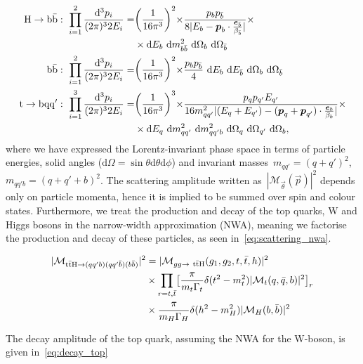 \begin{align}
\label{eq:phase_space_jacobian}
\mathrm{H} \rightarrow \mathrm{b}\bar{\mathrm{b}}:\ \prod_{i=1}^{2} \frac{\mathrm{d}^3 p_i}{(2\pi)^3 2 E_i} =& \biggr(\frac{1}{16 \pi^3}\biggl)^2 \times \frac{p_b p_{\bar{b}}}{8 |E_b - \boldsymbol{p}_b \cdot \frac{\boldsymbol{e}_{\bar{b}}}{\beta_{\bar{b}}}|} \times \\
&\times\mathrm{d}E_{b}~\mathrm{d}m^2_{b\bar{b}}~\mathrm{d}\Omega_{b}~\mathrm{d}\Omega_{\bar{b}} \\
\mathrm{b}\bar{\mathrm{b}}:\ \prod_{i=1}^{2} \frac{\mathrm{d}^3 p_i}{(2\pi)^3 2 E_i} =& \biggr(\frac{1}{16 \pi^3}\biggl)^2 \times \frac{p_b p_{\bar{b}}}{4}~\mathrm{d}E_{b}~\mathrm{d}E_{\bar{b}}~\mathrm{d}\Omega_{b}~\mathrm{d}\Omega_{\bar{b}} \\
\mathrm{t} \rightarrow \mathrm{b}\mathrm{q}\mathrm{q}':\ \prod_{i=1}^{3} \frac{\mathrm{d}^3 p_i}{(2\pi)^3 2 E_i} =& \biggr(\frac{1}{16 \pi^3}\biggl)^3 \times \frac{p_q p_{q'} E_{q'}}{16 m_{qq'}^2 |(E_q + E_{q'}) - (\boldsymbol{p}_q + \boldsymbol{p}_{q'})\cdot \frac{\boldsymbol{e}_b}{\beta_b}|}\times\\
&\times\mathrm{d}E_{q}~\mathrm{d}m^2_{qq'}~\mathrm{d}m^2_{qq'b}~\mathrm{d}\Omega_{q}~\mathrm{d}\Omega_{q'}~\mathrm{d}\Omega_b,
\end{align}
where we have expressed the Lorentz-invariant phase space in terms of particle energies, solid angles ($\mathrm{d}\Omega = \sin{\theta}\mathrm{d}\theta\mathrm{d}\phi$) and invariant masses~$m_{qq'} = (q+q')^2$,~$m_{qq'b} = (q + q' + b)^2$.
The scattering amplitude written as~$|\mathcal{M}_{\vec{\theta}}(\vec{p})|^2$ depends only on particle momenta, hence it is implied to be summed over spin and colour states. Furthermore, we treat the production and decay of the top quarks, W and Higgs bosons in the narrow-width approximation (NWA), meaning we factorise the production and decay of these particles, as seen in~\cref{eq:scattering_nwa}.

\begin{align}
\label{eq:scattering_nwa}
|\mathcal{M}_{\mathrm{t} \bar{\mathrm{t}} \mathrm{H} \rightarrow (qq'b) (qq'\bar{b}) (b\bar{b})}|^2 &= |\mathcal{M}_{gg \rightarrow~\mathrm{t} \bar{\mathrm{t}} \mathrm{H}}(g_1, g_2, t, \bar{t}, h)|^2 \\
&\times \prod_{r = t,\bar{t}} \bigl[ \frac{\pi}{m_t \Gamma_t} \delta(t^2 - m_t^2) |\mathcal{M}_t(q,\bar{q},b)|^2 \bigr]_r \\
&\times \frac{\pi}{m_H \Gamma_H} \delta(h^2 - m_H^2) |\mathcal{M}_H(b,\bar{b})|^2
\end{align}

The decay amplitude of the top quark, assuming the NWA for the W-boson, is given in~\cref{eq:decay_top}

